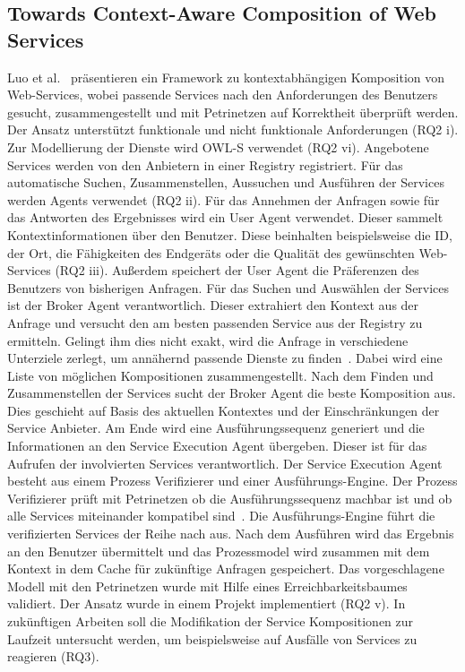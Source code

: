 \documentclass[conference,compsoc]{IEEEtran}
\begin{document}
\subsection{Towards Context-Aware Composition of Web Services}
Luo et al.~\cite{luo2006towards} präsentieren ein Framework zu kontextabhängigen Komposition von Web-Services, wobei passende Services nach den Anforderungen des Benutzers gesucht, zusammengestellt und mit Petrinetzen auf Korrektheit überprüft werden. Der Ansatz unterstützt funktionale und nicht funktionale Anforderungen (RQ2 i). Zur Modellierung der Dienste wird OWL-S verwendet (RQ2 vi). Angebotene Services werden von den Anbietern in einer Registry registriert. Für das automatische Suchen, Zusammenstellen, Aussuchen und Ausführen der Services werden Agents verwendet (RQ2 ii).
Für das Annehmen der Anfragen sowie für das Antworten des Ergebnisses wird ein User Agent verwendet. Dieser sammelt Kontextinformationen über den Benutzer. Diese beinhalten beispielsweise die ID, der Ort, die Fähigkeiten des Endgeräts oder die Qualität des gewünschten Web-Services (RQ2 iii). Außerdem speichert der User Agent die Präferenzen des Benutzers von bisherigen Anfragen.
Für das Suchen und Auswählen der Services ist der Broker Agent verantwortlich. Dieser extrahiert den Kontext aus der Anfrage und versucht den am besten passenden Service aus der Registry zu ermitteln. Gelingt ihm dies nicht exakt, wird die Anfrage in verschiedene Unterziele zerlegt, um annähernd passende Dienste zu finden~\cite{luo2006towards}. Dabei wird eine Liste von möglichen Kompositionen zusammengestellt. Nach dem Finden und Zusammenstellen der Services sucht der Broker Agent die beste Komposition aus. Dies geschieht auf Basis des aktuellen Kontextes und der Einschränkungen der Service Anbieter. Am Ende wird eine Ausführungssequenz generiert und die Informationen an den Service Execution Agent übergeben. Dieser ist für das Aufrufen der involvierten Services verantwortlich. Der Service Execution Agent besteht aus einem Prozess Verifizierer und einer Ausführungs-Engine. Der Prozess Verifizierer prüft mit Petrinetzen ob die Ausführungssequenz machbar ist und ob alle Services miteinander kompatibel sind~\cite{luo2006towards}. Die Ausführungs-Engine führt die verifizierten Services der Reihe nach aus. Nach dem Ausführen wird das Ergebnis an den Benutzer übermittelt und das Prozessmodel wird zusammen mit dem Kontext in dem Cache für zukünftige Anfragen gespeichert.
Das vorgeschlagene Modell mit den Petrinetzen wurde mit Hilfe eines Erreichbarkeitsbaumes validiert. Der Ansatz wurde in einem Projekt implementiert (RQ2 v). In zukünftigen Arbeiten soll die Modifikation der Service Kompositionen zur Laufzeit untersucht werden, um beispielsweise auf Ausfälle von Services zu reagieren (RQ3).
\end{document}
